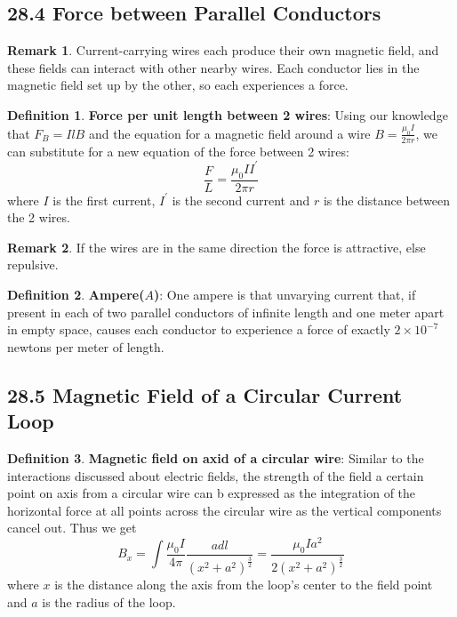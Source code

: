 \documentclass[12pt]{amsart}
\theoremstyle{definition}
\newtheorem{definition}{Definition} %
\newtheorem*{remark}{Remark}        %
\numberwithin{equation}{theorem}    %
\begin{document}
\subsection*{28.4 Force between Parallel Conductors}

\begin{remark}
    Current-carrying wires each produce their own magnetic field, and these fields can interact with other nearby wires. Each conductor lies in the magnetic field set up by the other, so each experiences a force.
\end{remark}

\begin{definition}
    \textbf{Force per unit length between 2 wires}:
    Using our knowledge that $F_B = IlB$ and the equation for a magnetic field around a wire $B = \frac{\mu_0I}{2\pi r}$, we can substitute for a new equation of the force between 2 wires: 
    $$\frac{F}{L} = \frac{\mu_0 I I^{'}}{2\pi r}$$
    where $I$ is the first current, $I^{'}$ is the second current and $r$ is the distance between the 2 wires.
    \begin{remark}
        If the wires are in the same direction the force is attractive, else repulsive.
    \end{remark}
\end{definition}


\begin{definition}
    \textbf{Ampere($A$)}:
    One ampere is that unvarying current that, if present in each of two parallel conductors of infinite length and one meter apart in empty space, causes each conductor to experience a force of exactly $2\times 10^{-7}$ newtons per meter of length.
\end{definition}

\subsection*{28.5 Magnetic Field of a Circular Current Loop}

\begin{definition}
    \textbf{Magnetic field on axid of a circular wire}:
    Similar to the interactions discussed about electric fields, the strength of the field a certain point on axis from a circular wire can b expressed as the integration of the horizontal force at all points across the circular wire as the vertical components cancel out. Thus we get $$B_x = \int \frac{\mu_0I}{4\pi}\frac{adl}{(x^2+a^2)^{\frac{3}{2}}} =\frac{\mu_0Ia^2}{2(x^2+a^2)^{\frac{3}{2}}}$$
    where $x$ is the distance along the axis from the loop's center to the field point and $a$ is the radius of the loop.
\end{definition}
\end{document}
